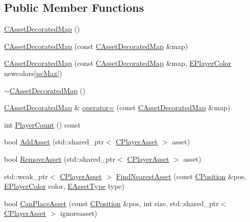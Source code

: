 \subsection*{Public Member Functions}
\begin{DoxyCompactItemize}
\item 
\hyperlink{classCAssetDecoratedMap_abdcbf60806b5a6b56b61381fd43dfaf8}{C\+Asset\+Decorated\+Map} ()
\item 
\hyperlink{classCAssetDecoratedMap_a33d7e91120fbd0c954761ee4b3d0a043}{C\+Asset\+Decorated\+Map} (const \hyperlink{classCAssetDecoratedMap}{C\+Asset\+Decorated\+Map} \&map)
\item 
\hyperlink{classCAssetDecoratedMap_ac22988ad1953fe43ae477dc5abc73db3}{C\+Asset\+Decorated\+Map} (const \hyperlink{classCAssetDecoratedMap}{C\+Asset\+Decorated\+Map} \&map, \hyperlink{GameDataTypes_8h_aafb0ca75933357ff28a6d7efbdd7602f}{E\+Player\+Color} newcolors\mbox{[}\hyperlink{GameDataTypes_8h_aafb0ca75933357ff28a6d7efbdd7602fa594a5c8dd3987f24e8a0f23f1a72cd34}{pc\+Max}\mbox{]})
\item 
\hyperlink{classCAssetDecoratedMap_ab91521b2e06dbac041add78a32c1476a}{$\sim$\+C\+Asset\+Decorated\+Map} ()
\item 
\hyperlink{classCAssetDecoratedMap}{C\+Asset\+Decorated\+Map} \& \hyperlink{classCAssetDecoratedMap_a0330faaf18f597b5e2ebbbfcd8bf2819}{operator=} (const \hyperlink{classCAssetDecoratedMap}{C\+Asset\+Decorated\+Map} \&map)
\item 
int \hyperlink{classCAssetDecoratedMap_a1ead2938a9585fa82b5b5ef72efe6eba}{Player\+Count} () const
\item 
bool \hyperlink{classCAssetDecoratedMap_aaa798030159fd44251dd60aef9b00516}{Add\+Asset} (std\+::shared\+\_\+ptr$<$ \hyperlink{classCPlayerAsset}{C\+Player\+Asset} $>$ asset)
\item 
bool \hyperlink{classCAssetDecoratedMap_a77f46be1ceb30bb83fc3f35c0d58a9a7}{Remove\+Asset} (std\+::shared\+\_\+ptr$<$ \hyperlink{classCPlayerAsset}{C\+Player\+Asset} $>$ asset)
\item 
std\+::weak\+\_\+ptr$<$ \hyperlink{classCPlayerAsset}{C\+Player\+Asset} $>$ \hyperlink{classCAssetDecoratedMap_a37f9ffaf70ea515c422544a52dd80483}{Find\+Nearest\+Asset} (const \hyperlink{classCPosition}{C\+Position} \&pos, \hyperlink{GameDataTypes_8h_aafb0ca75933357ff28a6d7efbdd7602f}{E\+Player\+Color} color, \hyperlink{GameDataTypes_8h_a5600d4fc433b83300308921974477fec}{E\+Asset\+Type} type)
\item 
bool \hyperlink{classCAssetDecoratedMap_ad4baef4b84b066847459e45205c8575c}{Can\+Place\+Asset} (const \hyperlink{classCPosition}{C\+Position} \&pos, int size, std\+::shared\+\_\+ptr$<$ \hyperlink{classCPlayerAsset}{C\+Player\+Asset} $>$ ignoreasset)

\end{DoxyCompactItemize}
